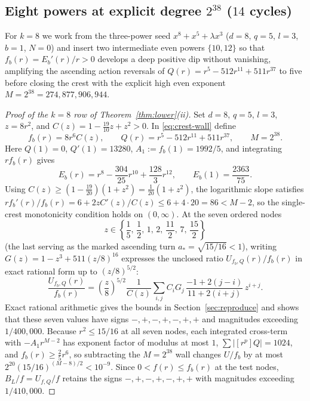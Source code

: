 \subsection{Eight powers at explicit degree $2^{38}$ ($14$ cycles)}\label{subsec:eight-powers}

For $k=8$ we work from the three-power seed $x^8+x^5+\lambda x^3$ ($d=8$, $q=5$, $l=3$, $b=1$, $N=0$)
and insert two intermediate even powers $\{10,12\}$ so that $f_b(r)=E_b'(r)/r>0$ develops a deep
positive dip without vanishing, amplifying the ascending action reversals of
$Q(r)=r^5-512r^{11}+511r^{37}$ to five before closing the crest with the explicit high even exponent
$M=2^{38}=274{,}877{,}906{,}944$.

\begin{proof}[Proof of the $k=8$ row of Theorem~\ref{thm:lower}\textup{(ii)}]
Set $d=8$, $q=5$, $l=3$, $z=8r^2$, and $C(z)=1-\frac{19}{10}z+z^2>0$. In \eqref{eq:crest-wall} define
\[
  f_b(r) = 8r^6 C(z), \qquad Q(r) = r^5 - 512r^{11} + 511r^{37}, \qquad M = 2^{38}.
\]
Here $Q(1)=0$, $Q'(1)=13280$, $A_1:=f_b(1)=1992/5$, and integrating $r f_b(r)$ gives
\[
  E_b(r) = r^8 - \frac{304}{25}r^{10} + \frac{128}{3}r^{12}, \qquad E_b(1) = \frac{2363}{75}.
\]
Using $C(z)\ge(1-\frac{19}{20})(1+z^2)=\frac{1}{20}(1+z^2)$, the logarithmic slope satisfies
$rf_b'(r)/f_b(r)=6+2zC'(z)/C(z)\le 6+4\cdot 20=86<M-2$, so the single-crest monotonicity condition
holds on $(0,\infty)$. At the seven ordered nodes
\[
  z \in \left\{\frac{1}{5},\, \frac{1}{2},\, 1,\, 2,\, \frac{11}{2},\, 7,\, \frac{15}{2}\right\}
\]
(the last serving as the marked ascending turn $a_*=\sqrt{15/16}<1$), writing $G(z)=1-z^3+511(z/8)^{16}$
expresses the unclosed ratio $U_{f_b,Q}(r)/f_b(r)$ in exact rational form up to $(z/8)^{5/2}$:
\[
  \frac{U_{f_b,Q}(r)}{f_b(r)} = \left(\frac{z}{8}\right)^{5/2}\frac{1}{C(z)}\sum_{i,j} C_i G_j\,\frac{-1+2(j-i)}{11+2(i+j)}\,z^{i+j}.
\]
Exact rational arithmetic gives the bounds in Section~\ref{sec:reproduce} and shows that these seven
values have signs $-,+,-,+,-,+,+$ and magnitudes exceeding $1/400{,}000$. Because $r^2\le 15/16$ at
all seven nodes, each integrated cross-term with $-A_1 r^{M-2}$ has exponent factor of modulus at most
$1$, $\sum|[r^p]Q|=1024$, and $f_b(r)\ge \frac{2}{5}r^6$, so subtracting the $M=2^{38}$ wall changes
$U/f_b$ by at most $2^{20}(15/16)^{(M-8)/2}<10^{-9}$. Since $0<f(r)\le f_b(r)$ at the test nodes,
$B_L/f=U_{f,Q}/f$ retains the signs $-,+,-,+,-,+,+$ with magnitudes exceeding $1/410{,}000$.


\end{proof}

